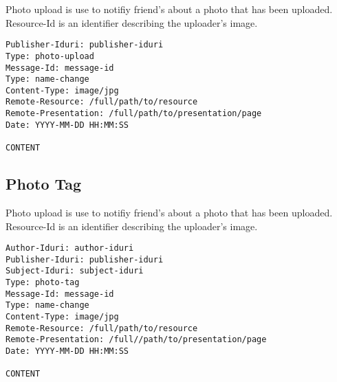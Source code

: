 \documentclass[letterpaper,11pt,oneside]{article}
\begin{document}
Photo upload is use to notifiy friend's about a photo that has been uploaded.
Resource-Id is an identifier describing the uploader's image.

\vspace{10pt}
\begin{verbatim}
Publisher-Iduri: publisher-iduri
Type: photo-upload
Message-Id: message-id
Type: name-change
Content-Type: image/jpg
Remote-Resource: /full/path/to/resource
Remote-Presentation: /full/path/to/presentation/page
Date: YYYY-MM-DD HH:MM:SS

CONTENT
\end{verbatim}
\vspace{10pt}

\subsection{Photo Tag}

Photo upload is use to notifiy friend's about a photo that has been uploaded.
Resource-Id is an identifier describing the uploader's image.

\vspace{10pt}
\begin{verbatim}
Author-Iduri: author-iduri
Publisher-Iduri: publisher-iduri
Subject-Iduri: subject-iduri
Type: photo-tag
Message-Id: message-id
Type: name-change
Content-Type: image/jpg
Remote-Resource: /full/path/to/resource
Remote-Presentation: /full//path/to/presentation/page
Date: YYYY-MM-DD HH:MM:SS

CONTENT
\end{verbatim}
\vspace{10pt}
\end{document}

